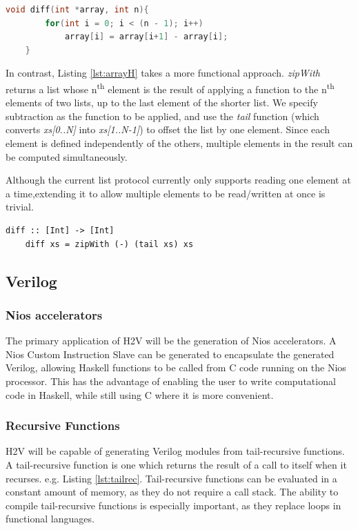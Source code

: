 \documentclass[english,onecolumn]{article}
\begin{document}
\begin{lstlisting}[language=C, caption={Array Bottleneck Example (C).}, label={lst:arrayC}]
    void diff(int *array, int n){
        for(int i = 0; i < (n - 1); i++)
            array[i] = array[i+1] - array[i];
    }
\end{lstlisting}

In contrast, Listing \ref{lst:arrayH} takes a more functional approach.
\textit{zipWith} returns a list whose n\textsuperscript{th} element is the result of applying a function to the n\textsuperscript{th} elements of two lists, up to the last element of the shorter list. We specify subtraction as the function to be applied, and use the \textit{tail} function (which converts \textit{xs[0..N]} into \textit{xs[1..N-1]}) to offset the list by one element.
Since each element is defined independently of the others, multiple elements in the result can be computed simultaneously.

Although the current list protocol currently only supports reading one element at a time,\footnotemark extending it to allow multiple elements to be read/written at once is trivial.

\begin{lstlisting}[caption={Array Bottleneck Example (Haskell).}, label={lst:arrayH}]
    diff :: [Int] -> [Int]
    diff xs = zipWith (-) (tail xs) xs
\end{lstlisting}

\subsection{Verilog}
\subsubsection{Nios accelerators}
The primary application of H2V will be the generation of Nios accelerators. A Nios Custom Instruction Slave can be generated to encapsulate the generated Verilog, allowing Haskell functions to be called from C code running on the Nios processor.
This has the advantage of enabling the user to write computational code in Haskell, while still using C where it is more convenient.

\subsubsection{Recursive Functions}
H2V will be capable of generating Verilog modules from tail-recursive functions. A tail-recursive function is one which returns the  result of a call to itself when it recurses. e.g. Listing \ref{lst:tailrec}. Tail-recursive functions can be evaluated in a constant amount of memory, as they do not require a call stack. The ability to compile tail-recursive functions is especially important, as they replace loops in functional languages.
\end{document}

